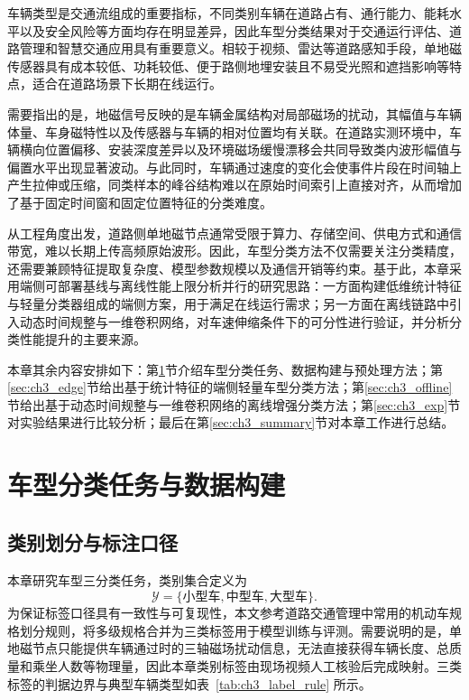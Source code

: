 \documentclass{xdupgthesis}
\begin{document}
车辆类型是交通流组成的重要指标，不同类别车辆在道路占有、通行能力、能耗水平以及安全风险等方面均存在明显差异，因此车型分类结果对于交通运行评估、道路管理和智慧交通应用具有重要意义。相较于视频、雷达等道路感知手段，单地磁传感器具有成本较低、功耗较低、便于路侧地埋安装且不易受光照和遮挡影响等特点，适合在道路场景下长期在线运行。

需要指出的是，地磁信号反映的是车辆金属结构对局部磁场的扰动，其幅值与车辆体量、车身磁特性以及传感器与车辆的相对位置均有关联。在道路实测环境中，车辆横向位置偏移、安装深度差异以及环境磁场缓慢漂移会共同导致类内波形幅值与偏置水平出现显著波动。与此同时，车辆通过速度的变化会使事件片段在时间轴上产生拉伸或压缩，同类样本的峰谷结构难以在原始时间索引上直接对齐，从而增加了基于固定时间窗和固定位置特征的分类难度。

从工程角度出发，道路侧单地磁节点通常受限于算力、存储空间、供电方式和通信带宽，难以长期上传高频原始波形。因此，车型分类方法不仅需要关注分类精度，还需要兼顾特征提取复杂度、模型参数规模以及通信开销等约束。基于此，本章采用端侧可部署基线与离线性能上限分析并行的研究思路：一方面构建低维统计特征与轻量分类器组成的端侧方案，用于满足在线运行需求；另一方面在离线链路中引入动态时间规整与一维卷积网络，对车速伸缩条件下的可分性进行验证，并分析分类性能提升的主要来源。

本章其余内容安排如下：第\ref{sec:ch3_task_data}节介绍车型分类任务、数据构建与预处理方法；第\ref{sec:ch3_edge}节给出基于统计特征的端侧轻量车型分类方法；第\ref{sec:ch3_offline}节给出基于动态时间规整与一维卷积网络的离线增强分类方法；第\ref{sec:ch3_exp}节对实验结果进行比较分析；最后在第\ref{sec:ch3_summary}节对本章工作进行总结。

\section{车型分类任务与数据构建}
\label{sec:ch3_task_data}

\subsection{类别划分与标注口径}
\label{subsec:ch3_label_rule}

本章研究车型三分类任务，类别集合定义为
\begin{equation}
    \mathcal{Y}=\{\text{小型车},\text{中型车},\text{大型车}\}.
\end{equation}
为保证标签口径具有一致性与可复现性，本文参考道路交通管理中常用的机动车规格划分规则，将多级规格合并为三类标签用于模型训练与评测。需要说明的是，单地磁节点只能提供车辆通过时的三轴磁场扰动信息，无法直接获得车辆长度、总质量和乘坐人数等物理量，因此本章类别标签由现场视频人工核验后完成映射。三类标签的判据边界与典型车辆类型如表~\ref{tab:ch3_label_rule} 所示。
\end{document}
